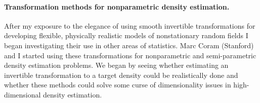\documentclass[12pt]{article}
\begin{document}
%
%



\paragraph{Transformation methods for nonparametric density estimation.}
After my exposure to the elegance of using  smooth invertible transformations for developing flexible, physically realistic models of nonstationary random fields I began investigating their use in other areas of statistics. Marc Coram (Stanford) and I started using these  transformations for nonparametric and semi-parametric density estimation problems.   We began by seeing whether estimating an invertible transformation to a target density could be realistically done and whether these methods could solve some curse of dimensionality issues in  high-dimensional density estimation.
\end{document}
